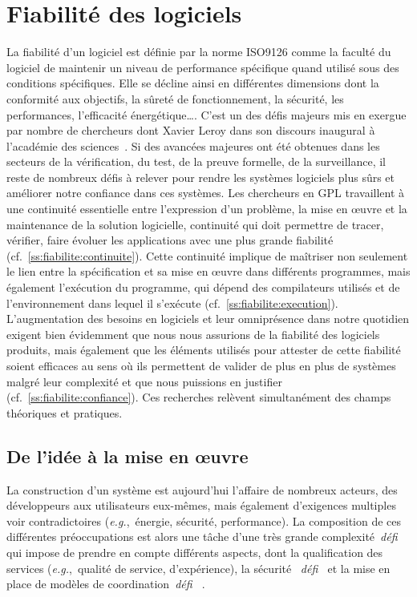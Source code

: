 \documentclass[11pt]{article}
\newcommand{\eg}[0]{\emph{e.g.},~}
\newcommand{\cf}[0]{cf.~}
\newcommand{\defi}[1]{\emph{défi~%
\cite{#1}}}
\begin{document}
\section{Fiabilité des logiciels\label{s:fiabilite}}
La fiabilité d'un logiciel est définie par la norme ISO9126 comme la faculté du logiciel de maintenir un niveau de performance spécifique quand utilisé sous des conditions spécifiques. Elle se décline ainsi en différentes dimensions dont la conformité aux objectifs, la sûreté de fonctionnement, la sécurité, les performances, l'efficacité énergétique\ldots. 
C'est un des défis majeurs mis en exergue par nombre de chercheurs dont Xavier Leroy dans son discours inaugural à l'académie des sciences~\cite{leroy:hal-02370113}. Si des avancées majeures ont été obtenues dans les secteurs de la vérification, du test, de la preuve formelle, de la surveillance, il reste de nombreux défis à relever pour rendre les systèmes logiciels plus sûrs et améliorer notre confiance dans ces systèmes. 
Les chercheurs en GPL travaillent à une continuité essentielle entre l'expression d'un problème, la mise en {\oe}uvre et la maintenance de la solution logicielle, continuité qui doit permettre de tracer, vérifier, faire évoluer les applications avec une plus grande fiabilité (cf.~\ref{ss:fiabilite:continuite}). Cette continuité implique de maîtriser non seulement le lien entre la spécification et sa mise en  {\oe}uvre dans différents  programmes, mais également l'exécution du programme, qui dépend des compilateurs utilisés et de l'environnement dans lequel il s'exécute (\cf\ref{ss:fiabilite:execution}). 
L'augmentation des besoins en logiciels et leur omniprésence dans notre quotidien exigent bien évidemment que nous nous assurions de la fiabilité des logiciels produits, mais également que les éléments utilisés pour attester de cette fiabilité soient efficaces au sens où ils permettent de valider de plus en plus de systèmes malgré leur complexité et  que nous puissions en justifier (\cf\ref{ss:fiabilite:confiance}).
Ces recherches relèvent simultanément des champs théoriques et pratiques.


\subsection{De l'idée à la mise en {\oe}uvre\label{ss:fiabilite:continuite}} 
La construction d'un système est aujourd'hui l'affaire de nombreux acteurs, des développeurs aux utilisateurs eux-mêmes, mais également d'exigences multiples voir contradictoires (\eg énergie, sécurité, performance). La composition de ces différentes préoccupations est alors une tâche d'une très grande complexité~\defi{argumentation} qui impose de prendre en compte différents aspects, dont la qualification des services (\eg qualité de service, d'expérience), la sécurité
~\defi{securite} et la mise en place de modèles de coordination~\defi{reconfiguration}.
\end{document}
